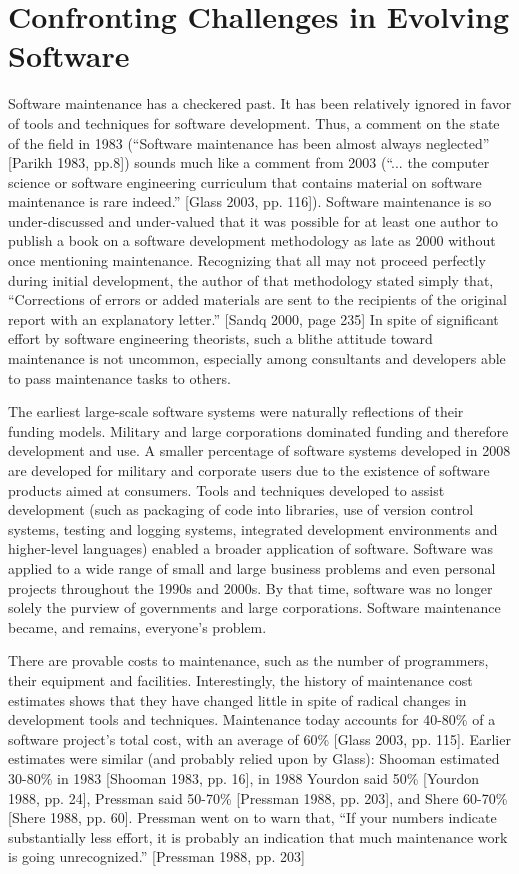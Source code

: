 \section{Confronting Challenges in Evolving Software}

Software maintenance has a checkered past.  It has been relatively ignored in favor of tools and techniques for software development.  Thus, a comment on the state of the field in 1983 (``Software maintenance has been almost always neglected'' [Parikh 1983, pp.8]) sounds much like a comment from 2003 (``... the computer science or software engineering curriculum that contains material on software maintenance is rare indeed.'' [Glass 2003, pp. 116]).  Software maintenance is so under-discussed and under-valued that it was possible for at least one author to publish a book on a software development methodology as late as 2000 without once mentioning maintenance. Recognizing that all may not proceed perfectly during initial development, the author of that methodology stated simply that, ``Corrections of errors or added materials are sent to the recipients of the original report with an explanatory letter.'' [Sandq 2000, page 235]  In spite of significant effort by software engineering theorists, such a blithe attitude toward maintenance is not uncommon, especially among consultants and developers able to pass maintenance tasks to others.

The earliest large-scale software systems were naturally reflections of their funding models.  Military and large corporations dominated funding and therefore development and use.  A smaller percentage of software systems developed in 2008 are developed for military and corporate users due to the existence of software products aimed at consumers.  Tools and techniques developed to assist development (such as packaging of code into libraries, use of version control systems, testing and logging systems, integrated development environments and higher-level languages) enabled a broader application of software.  Software was applied to a wide range of small and large business problems and even personal projects throughout the 1990s and 2000s.  By that time, software was no longer solely the purview of governments and large corporations.  Software maintenance became, and remains, everyone's problem.

There are provable costs to maintenance, such as the number of programmers, their equipment and facilities. Interestingly, the history of maintenance cost estimates shows that they have changed little in spite of radical changes in development tools and techniques. Maintenance today accounts for 40-80\% of a software project's total cost, with an average of 60\% [Glass 2003, pp. 115].  Earlier estimates were similar (and probably relied upon by Glass):  Shooman estimated 30-80\% in 1983 [Shooman 1983, pp. 16], in 1988 Yourdon said 50\% [Yourdon 1988, pp. 24], Pressman said 50-70\% [Pressman 1988, pp. 203], and Shere 60-70\% [Shere 1988, pp. 60].  Pressman went on to warn that, ``If your numbers indicate substantially less effort, it is probably an indication that much maintenance work is going unrecognized.'' [Pressman 1988, pp. 203]

